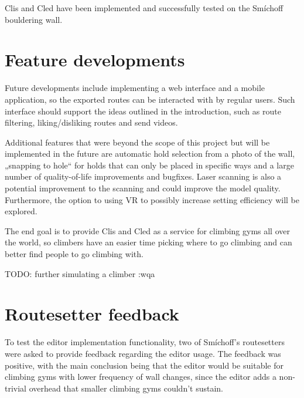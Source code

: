 \label{sec:conclusion}
Clis and Cled have been implemented and successfully tested on the Smíchoff bouldering wall.

\setcounter{secnumdepth}{0}

\section{Feature developments}
Future developments include implementing a web interface and a mobile application, so the exported routes can be interacted with by regular users.
Such interface should support the ideas outlined in the introduction, such as route filtering, liking/disliking routes and send videos.

Additional features that were beyond the scope of this project but will be implemented in the future are automatic hold selection from a photo of the wall, „snapping to hole“ for holds that can only be placed in specific ways and a large number of quality-of-life improvements and bugfixes.
Laser scanning is also a potential improvement to the scanning and could improve the model quality.
Furthermore, the option to using VR to possibly increase setting efficiency will be explored.

The end goal is to provide Clis and Cled as a service for climbing gyms all over the world, so climbers have an easier time picking where to go climbing and can better find people to go climbing with.

TODO: further simulating a climber :wqa

\section{Routesetter feedback}
To test the editor implementation functionality, two of Smíchoff's routesetters were asked to provide feedback regarding the editor usage.
The feedback was positive, with the main conclusion being that the editor would be suitable for climbing gyms with lower frequency of wall changes, since the editor adds a non-trivial overhead that smaller climbing gyms couldn't sustain.

\setcounter{secnumdepth}{3}
